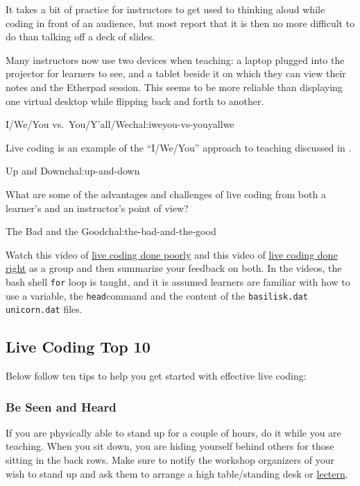 It takes a bit of practice for instructors to get used to thinking aloud
while coding in front of an audience, but most report that it is then no
more difficult to do than talking off a deck of slides.

Many instructors now use two devices when teaching: a laptop plugged
into the projector for learners to see, and a tablet beside it on which
they can view their notes and the Etherpad session. This seems to be
more reliable than displaying one virtual desktop while flipping back
and forth to another.

\begin{challenge}{I/We/You vs.~You/Y'all/We}{chal:iweyou-vs-youyallwe}

Live coding is an example of the ``I/We/You'' approach to teaching
discussed in .
\end{challenge}

\begin{challenge}{Up and Down}{chal:up-and-down}

What are some of the advantages and challenges of live coding from both
a learner's and an instructor's point of view?
\end{challenge}

\begin{challenge}{The Bad and the Good}{chal:the-bad-and-the-good}

Watch this video of \href{https://youtu.be/bXxBeNkKmJE}{live coding done
poorly} and this video of \href{https://youtu.be/SkPmwe\_WjeY}{live
coding done right} as a group and then summarize your feedback on both.
In the videos, the bash shell \texttt{for} loop is taught, and it is
assumed learners are familiar with how to use a variable, the
\texttt{head}command and the content of the
\texttt{basilisk.dat unicorn.dat} files.
\end{challenge}

\subsection{Live Coding Top 10}\label{live-coding-top-10}

Below follow ten tips to help you get started with effective live
coding:

\subsubsection{Be Seen and Heard}\label{be-seen-and-heard}

If you are physically able to stand up for a couple of hours, do it
while you are teaching. When you sit down, you are hiding yourself
behind others for those sitting in the back rows. Make sure to notify
the workshop organizers of your wish to stand up and ask them to arrange
a high table/standing desk or
\href{https://en.wikipedia.org/wiki/Lectern\#Academic\_context}{lectern}.

